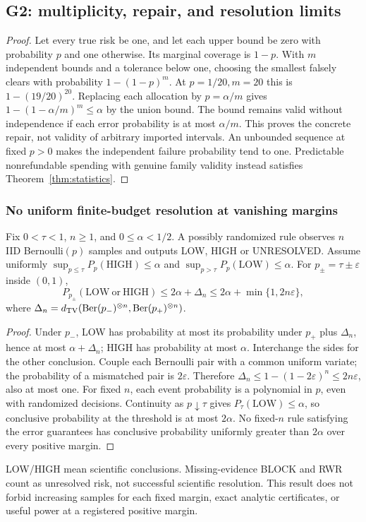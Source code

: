 \subsection{G2: multiplicity, repair, and resolution limits}
\begin{proof}
Let every true risk be one, and let each upper bound be zero with probability
$p$ and one otherwise. Its marginal coverage is $1-p$.
With $m$ independent bounds and a tolerance below one, choosing the smallest
falsely clears with probability $1-(1-p)^m$. At $p=1/20,m=20$ this is
$1-(19/20)^{20}$. Replacing each allocation by $p=\alpha/m$ gives
$1-(1-\alpha/m)^m\le\alpha$ by the union bound. The bound remains valid
without independence if each error probability is at most $\alpha/m$.
This proves the concrete repair, not validity of arbitrary imported intervals.
An unbounded sequence at fixed $p>0$ makes the independent failure probability
tend to one. Predictable nonrefundable spending with genuine family validity
instead satisfies Theorem~\ref{thm:statistics}.
\end{proof}

\subsubsection{No uniform finite-budget resolution at vanishing margins}
\label{app:threshold}
\begin{proposition}
\label{prop:threshold}
Fix $0<\tau<1$, $n\ge1$, and $0\le\alpha<1/2$. A possibly randomized rule
observes $n$ IID Bernoulli$(p)$ samples and outputs LOW, HIGH or UNRESOLVED.
Assume uniformly
$\sup_{p\le\tau}P_p(\mathrm{HIGH})\le\alpha$ and
$\sup_{p>\tau}P_p(\mathrm{LOW})\le\alpha$.
For $p_\pm=\tau\pm\varepsilon$ inside $(0,1)$,
\[
 P_{p_\pm}(\mathrm{LOW\ or\ HIGH})
 \le 2\alpha+\Delta_n
 \le 2\alpha+\min\{1,2n\varepsilon\},
\]
where $\Delta_n=d_{\rm TV}(\mathrm{Ber}(p_-)^{\otimes n},
\mathrm{Ber}(p_+)^{\otimes n})$.
\end{proposition}
\begin{proof}
Under $p_-$, LOW has probability at most its probability under $p_+$ plus
$\Delta_n$, hence at most $\alpha+\Delta_n$; HIGH has probability at most
$\alpha$. Interchange the sides for the other conclusion.
Couple each Bernoulli pair with a common uniform variate; the probability of
a mismatched pair is $2\varepsilon$.
Therefore $\Delta_n\le1-(1-2\varepsilon)^n\le2n\varepsilon$, also at most one.
For fixed $n$, each event probability is a polynomial in $p$, even with
randomized decisions. Continuity as $p\downarrow\tau$ gives
$P_\tau(\mathrm{LOW})\le\alpha$, so conclusive probability at the threshold
is at most $2\alpha$. No fixed-$n$ rule satisfying the error guarantees
has conclusive probability uniformly greater than $2\alpha$ over every
positive margin.
\end{proof}
LOW/HIGH mean scientific conclusions. Missing-evidence BLOCK and RWR count
as unresolved risk, not successful scientific resolution. This result does
not forbid increasing samples for each fixed margin, exact analytic
certificates, or useful power at a registered positive margin.

